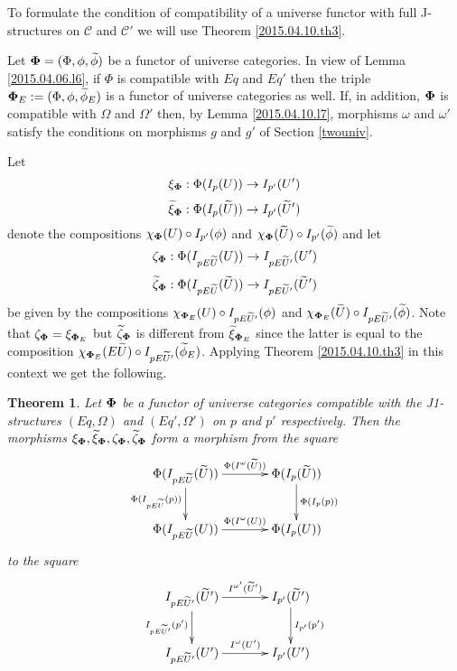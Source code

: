 \documentclass[12pt]{article}
\numberwithin{equation}{section}
\newtheorem{theorem}[proposition]{Theorem}
\newcommand{\llabel}[1]{\label{#1}}
\newcommand{\sr}{\rightarrow}
\newcommand{\wt}{\widetilde}
\begin{document}
To formulate the condition of compatibility of a universe functor with full
J-structures on $\mathcal C$ and $\mathcal C'$ we will use Theorem
\ref{2015.04.10.th3}.

Let ${\bf\Phi}=(\Phi,\phi,\wt{\phi})$ be a functor of universe categories. In
view of Lemma \ref{2015.04.06.l6}, if $\Phi$ is compatible with $Eq$ and $Eq'$
then the triple ${\bf\Phi}_{E}:=(\Phi,\phi,\wt{\phi}_{E})$ is a functor of
universe categories as well. If, in addition, ${\bf\Phi}$ is compatible with
$\Omega$ and $\Omega'$ then, by Lemma \ref{2015.04.10.l7}, morphisms $\omega$
and $\omega'$ satisfy the conditions on morphisms $g$ and $g'$ of Section
\ref{twouniv}.

Let
%
$$\xi_{\bf\Phi}:\Phi(I_p(U))\sr I_{p'}(U')$$
$$\wt{\xi}_{\bf\Phi}:\Phi(I_p(\wt{U}))\sr I_{p'}(\wt{U}')$$
%
denote the compositions $\chi_{\bf\Phi}(U)\circ I_{p'}(\phi)$ and
$\chi_{\bf\Phi}(\wt{U})\circ I_{p'}(\wt{\phi})$ and let
%
$$\zeta_{\bf\Phi}:\Phi(I_{pE\wt{U}}(U))\sr I_{pE\wt{U}'}(U')$$
$$\wt{\zeta}_{\bf\Phi}:\Phi(I_{pE\wt{U}}(\wt{U}))\sr I_{pE\wt{U}'}(\wt{U}')$$
%
be given by the compositions $\chi_{{\bf\Phi}_{E}}(U)\circ I_{pE\wt{U}'}(\phi)$
and $\chi_{{\bf\Phi}_{E}}(\wt{U})\circ I_{pE\wt{U}'}(\wt{\phi})$. Note that
$\zeta_{\bf\Phi}=\xi_{{\bf\Phi}_{E}}$ but $\wt{\zeta}_{\bf\Phi}$ is different
from $\wt{\xi}_{{\bf\Phi}_{E}}$ since the latter is equal to the composition
$\chi_{{\bf\Phi}_{E}}(E\wt{U})\circ I_{pE\wt{U}'}(\wt{\phi}_{E})$. Applying
Theorem \ref{2015.04.10.th3} in this context we get the following.
%
\begin{theorem}
\llabel{2015.04.10.th1} Let ${\bf\Phi}$ be a functor of universe categories
compatible with the J1-structures $(Eq,\Omega)$ and $(Eq',\Omega')$ on $p$ and
$p'$ respectively. Then the morphisms $\xi_{\bf\Phi}, \wt{\xi}_{\bf\Phi},
\zeta_{\bf\Phi}, \wt{\zeta}_{\bf\Phi}$ form a morphism from the square
%
$$
\begin{xy}
          \xymatrix@C=3pc{ \Phi(I_{pE\wt{U}}(\wt{U}))
            \ar[r]^-{\Phi(I^{\omega}(\wt{U}))} \ar[d]_{\Phi(I_{pE\wt{U}}(p))} &
            \Phi(I_p(\wt{U}))\ar[d]^-{\Phi(I_p(p))}\\ \Phi(I_{pE\wt{U}}(U))
            \ar[r]^-{\Phi(I^{\omega}(U))} & \Phi(I_p(U)) }
\end{xy}
$$
%
to the square
%
$$
\begin{xy}
          \xymatrix@C=3pc{ I_{pE\wt{U}'}(\wt{U}')
            \ar[r]^-{I^{\omega'}(\wt{U}')} \ar[d]_-{I_{pE\wt{U}'}(p')} &
            I_{p'}(\wt{U}')\ar[d]^-{I_{p'}(p')}\\ I_{pE\wt{U}'}(U')
            \ar[r]^-{I^{\omega}(U')} & I_{p'}(U') }
\end{xy}
$$
%
\end{theorem}
\end{document}
